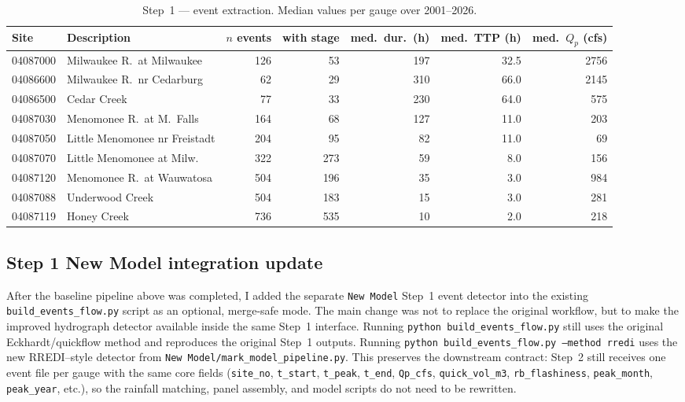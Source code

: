\documentclass[11pt]{article}
\begin{document}
\begin{table}[htbp]\centering
\caption{Step~1 --- event extraction. Median values per gauge over 2001--2026.}
\label{tab:events}
\small
\begin{tabular}{llrrrrr}
\toprule
Site & Description & $n$ events & with stage & med.\ dur.\ (h) & med.\ TTP (h) & med.\ $Q_p$ (cfs) \\
\midrule
04087000 & Milwaukee R.\ at Milwaukee   & 126 & 53  & 197 & 32.5 & 2756 \\
04086600 & Milwaukee R.\ nr Cedarburg   & 62  & 29  & 310 & 66.0 & 2145 \\
04086500 & Cedar Creek                  & 77  & 33  & 230 & 64.0 & 575  \\
04087030 & Menomonee R.\ at M.\ Falls   & 164 & 68  & 127 & 11.0 & 203  \\
04087050 & Little Menomonee nr Freistadt& 204 & 95  & 82  & 11.0 & 69   \\
04087070 & Little Menomonee at Milw.    & 322 & 273 & 59  & 8.0  & 156  \\
04087120 & Menomonee R.\ at Wauwatosa   & 504 & 196 & 35  & 3.0  & 984  \\
04087088 & Underwood Creek              & 504 & 183 & 15  & 3.0  & 281  \\
04087119 & Honey Creek                  & 736 & 535 & 10  & 2.0  & 218  \\
\bottomrule
\end{tabular}
\end{table}

\subsection{Step 1 New Model integration update}
After the baseline pipeline above was completed, I added the separate
\texttt{New Model} Step~1 event detector into the existing
\texttt{build\_events\_flow.py} script as an optional, merge-safe mode. The main change was
not to replace the original workflow, but to make the improved hydrograph detector available
inside the same Step~1 interface. Running \texttt{python build\_events\_flow.py} still uses
the original Eckhardt/quickflow method and reproduces the original Step~1 outputs. Running
\texttt{python build\_events\_flow.py --method rredi} uses the new RREDI--style detector
from \texttt{New Model/mark\_model\_pipeline.py}. This preserves the downstream contract:
Step~2 still receives one event file per gauge with the same core fields
(\texttt{site\_no}, \texttt{t\_start}, \texttt{t\_peak}, \texttt{t\_end},
\texttt{Qp\_cfs}, \texttt{quick\_vol\_m3}, \texttt{rb\_flashiness},
\texttt{peak\_month}, \texttt{peak\_year}, etc.), so the rainfall matching, panel assembly,
and model scripts do not need to be rewritten.
\end{document}
